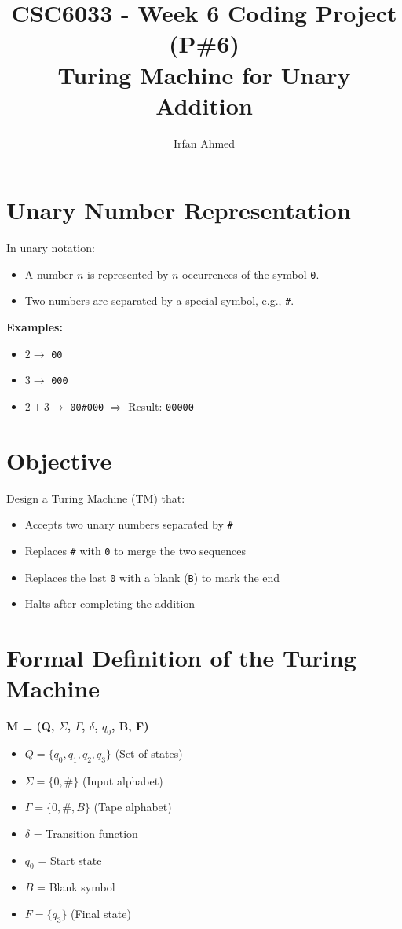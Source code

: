 \documentclass[12pt]{article}
\title{CSC6033 - Week 6 Coding Project (P\#6)\\Turing Machine for Unary Addition}
\author{Irfan Ahmed}
\date{}
\begin{document}
\maketitle

\section*{Unary Number Representation}
In unary notation:
\begin{itemize}
    \item A number $n$ is represented by $n$ occurrences of the symbol \texttt{0}.
    \item Two numbers are separated by a special symbol, e.g., \texttt{\#}.
\end{itemize}

\textbf{Examples:}
\begin{itemize}
    \item $2 \rightarrow$ \texttt{00}
    \item $3 \rightarrow$ \texttt{000}
    \item $2 + 3 \rightarrow$ \texttt{00\#000} $\Rightarrow$ Result: \texttt{00000}
\end{itemize}

\section*{Objective}
Design a Turing Machine (TM) that:
\begin{itemize}
    \item Accepts two unary numbers separated by \texttt{\#}
    \item Replaces \texttt{\#} with \texttt{0} to merge the two sequences
    \item Replaces the last \texttt{0} with a blank (\texttt{B}) to mark the end
    \item Halts after completing the addition
\end{itemize}

\section*{Formal Definition of the Turing Machine}
\textbf{M = (Q, $\Sigma$, $\Gamma$, $\delta$, $q_0$, B, F)}

\begin{itemize}
    \item $Q = \{q_0, q_1, q_2, q_3\}$ \hfill (Set of states)
    \item $\Sigma = \{0, \#\}$ \hfill (Input alphabet)
    \item $\Gamma = \{0, \#, B\}$ \hfill (Tape alphabet)
    \item $\delta$ = Transition function
    \item $q_0$ = Start state
    \item $B$ = Blank symbol
    \item $F = \{q_3\}$ \hfill (Final state)
\end{itemize}
\end{document}
